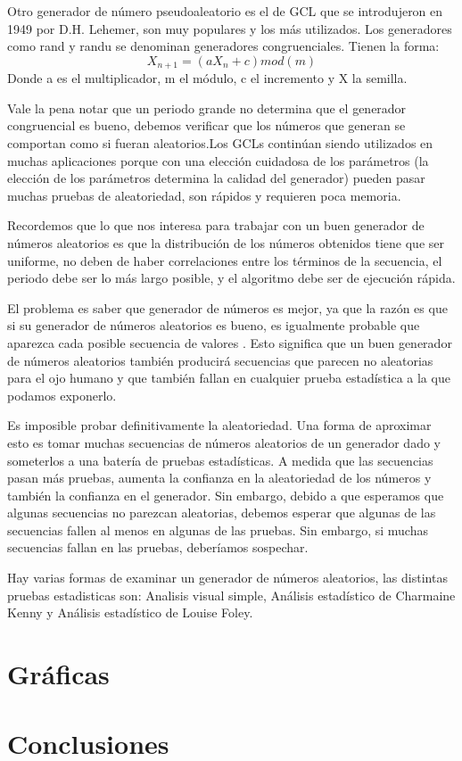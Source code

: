 \documentclass{article}
\begin{document}
Otro generador de número pseudoaleatorio es el de GCL que se introdujeron en 1949 por D.H. Lehemer, son muy populares y los más utilizados. Los generadores como rand y randu se denominan generadores congruenciales. Tienen la forma:
\begin{equation}
    X_{n+1} = (aX_{n}+c)mod(m)
\end{equation}
Donde a es el multiplicador, m el módulo, c el incremento y X la semilla.

Vale la pena notar que un periodo grande no determina que el generador congruencial es bueno, debemos verificar que los números que generan se comportan como si fueran aleatorios.Los GCLs continúan siendo utilizados en muchas aplicaciones porque con una elección cuidadosa de los parámetros (la elección de los parámetros determina la calidad del generador) pueden pasar muchas pruebas de aleatoriedad, son rápidos y requieren poca memoria.

Recordemos que lo que nos interesa para trabajar con un buen generador de números aleatorios es que la distribución de los números obtenidos tiene que ser uniforme, no deben de haber correlaciones entre los términos de la secuencia, el periodo debe ser lo más largo posible, y el algoritmo debe ser de ejecución rápida.

El problema es saber que generador de números es mejor, ya que la razón es que si su generador de números aleatorios es bueno, es igualmente probable que aparezca cada posible secuencia de valores . Esto significa que un buen generador de números aleatorios también producirá secuencias que parecen no aleatorias para el ojo humano y que también fallan en cualquier prueba estadística a la que podamos exponerlo. 


Es imposible probar definitivamente la aleatoriedad. Una forma de aproximar esto es tomar muchas secuencias de números aleatorios de un generador dado y someterlos a una batería de pruebas estadísticas. A medida que las secuencias pasan más pruebas, aumenta la confianza en la aleatoriedad de los números y también la confianza en el generador. Sin embargo, debido a que esperamos que algunas secuencias no parezcan aleatorias, debemos esperar que algunas de las secuencias fallen al menos en algunas de las pruebas. Sin embargo, si muchas secuencias fallan en las pruebas, deberíamos sospechar.

Hay varias formas de examinar un generador de números aleatorios, las distintas pruebas estadisticas son: Analisis visual simple, Análisis estadístico de Charmaine Kenny y Análisis estadístico de Louise Foley.
 




\section{Gráficas}


\section{Conclusiones}
\end{document}
